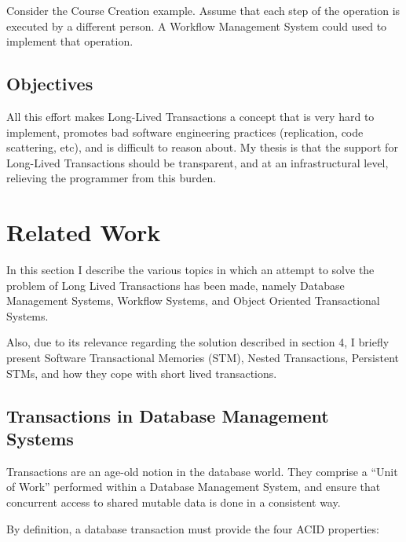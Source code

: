 \documentclass{llncs}
\begin{document}
Consider the Course Creation example. Assume that each step of the
operation is executed by a different person. A Workflow Management
System could used to implement that operation.

\subsection{Objectives}

All this effort makes Long-Lived Transactions a concept that is very
hard to implement, promotes bad software engineering practices
(replication, code scattering, etc), and is difficult to reason
about. My thesis is that the support for Long-Lived Transactions
should be transparent, and at an infrastructural level, relieving the
programmer from this burden.

\section{Related Work}

In this section I describe the various topics in which an attempt to
solve the problem of Long Lived Transactions has been made, namely
Database Management Systems, Workflow Systems, and Object Oriented
Transactional Systems.

Also, due to its relevance regarding the solution described in section
4, I briefly present Software Transactional Memories (STM), Nested
Transactions, Persistent STMs, and how they cope with short lived
transactions.

\subsection{Transactions in Database Management Systems}
\label{sec:rdbms}

Transactions are an age-old notion in the database world. They
comprise a ``Unit of Work'' performed within a Database Management
System, and ensure that concurrent access to shared mutable data is
done in a consistent way.

By definition, a database transaction must provide the four ACID
properties:
\end{document}
